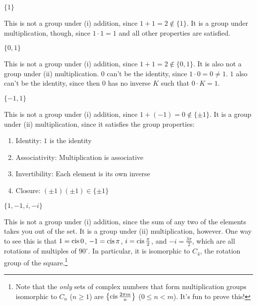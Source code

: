 \documentclass[../key.tex]{subfiles}
\begin{document}
\begin{inner_problem}
\item $\{1\}$
\end{inner_problem}

This is not a group under (i) addition, since $1+1=2\not\in \{1\}$. It is a group under multiplication, though, since $1\cdot 1 = 1$ and all other properties are satisfied.

\begin{inner_problem}
\item $\{0,1\}$
\end{inner_problem}

This is not a group under (i) addition, since $1+1=2\not\in \{0,1\}$. It is also not a group under (ii) multiplication. $0$ can't be the identity, since $1\cdot 0=0\neq 1$. $1$ also can't be the identity, since then $0$ has no inverse $K$ such that $0\cdot K = 1$.

\begin{inner_problem}
\item $\{-1,1\}$
\end{inner_problem}

This is not a group under (i) addition, since $1+(-1)=0\not\in\{\pm 1\}$. It is a group under (ii) multiplication, since it satisfies the group properties:

\begin{enumerate}
    \item Identity: $1$ is the identity
    \item Associativity: Multiplication is associative
    \item Invertibility: Each element is its own inverse
    \item Closure: $(\pm 1)(\pm 1) \in \{ \pm 1 \}$
\end{enumerate}

\begin{inner_problem}
\item $\{1, -1, i, -i\}$
\end{inner_problem}

This is not a group under (i) addition, since the sum of any two of the elements takes you out of the set. It is a group under (ii) multiplication, however. One way to see this is that $1=\operatorname{cis} 0$, $-1 = \operatorname{cis} \pi$, $i=\operatorname{cis} \frac{\pi}{2}$, and $-i=\frac{3\pi}{2}$, which are all rotations of multiples of $90^\circ$. In particular, it is isomorphic to $C_4$, the rotation group of the square.\footnote{Note that the \textit{only} sets of complex numbers that form multiplication groups isomorphic
to $C_n$ ($n\geq 1$) are $\left\{ \operatorname{cis} \frac{2\pi m}{n} \right\}$ ($0\leq n < m$). It's fun to prove this!}
\end{document}
